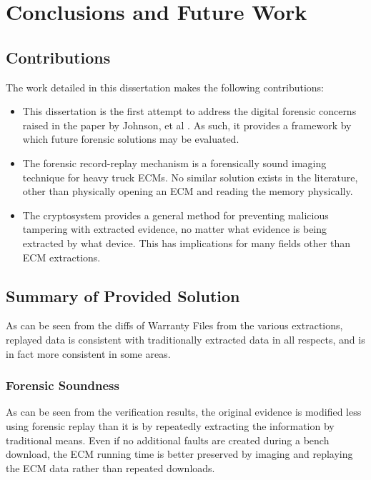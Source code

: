 \chapter{Conclusions and Future Work}

\section{Contributions}

The work detailed in this dissertation makes the following contributions:

\begin{itemize}

  \item This dissertation is the first attempt to address the digital forensic concerns raised in the
        paper by Johnson, et al \cite{Johnson2014}. As such, it provides a framework by which future
        forensic solutions may be evaluated.
  \item The forensic record-replay mechanism is a forensically sound imaging technique for heavy truck ECMs.
        No similar solution exists in the literature, other than physically opening an ECM and reading the
        memory physically.
  \item The cryptosystem provides a general method for preventing malicious tampering with extracted evidence,
        no matter what evidence is being extracted by what device. This has implications for many fields other
        than ECM extractions.

\end{itemize}

\section{Summary of Provided Solution}

As can be seen from the diffs of Warranty Files from the various extractions, replayed data is consistent with
traditionally extracted data in all respects, and is in fact more consistent in some areas.

\subsection{Forensic Soundness}

As can be seen from the verification results, the original evidence is modified less using forensic replay than it is by repeatedly
extracting the information by traditional means. Even if no additional faults are created during a bench download, the ECM running
time is better preserved by imaging and replaying the ECM data rather than repeated downloads.

